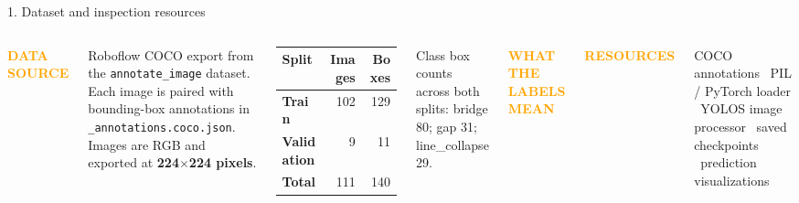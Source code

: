 \documentclass[aspectratio=169,11pt]{beamer}
\newcommand{\tagline}[1]{\textcolor{orange}{\small\bfseries #1}}
\begin{document}
\begin{frame}{1. Dataset and inspection resources}
  \begin{columns}[T]
    \tagline{DATA SOURCE}\par\vspace{0.05cm}
    Roboflow COCO export from the \texttt{annotate\_image} dataset. Each image is paired with bounding-box annotations in \texttt{\_annotations.coco.json}. Images are RGB and exported at \textbf{224$\times$224 pixels}.
    \vspace{0.22cm}
    \begin{tabular}{>{\bfseries}p{2.0cm}r r}
      \toprule
      Split & Images & Boxes\\
      \midrule
      Train & 102 & 129\\
      Validation & 9 & 11\\
      \midrule
      Total & 111 & 140\\
      \bottomrule
    \end{tabular}
    \vspace{0.18cm}

    \scriptsize\textcolor{steel}{Class box counts across both splits: bridge 80; gap 31; line\_collapse 29.}

    \tagline{WHAT THE LABELS MEAN}\par\vspace{0.05cm}
    \vspace{0.18cm}
    \tagline{RESOURCES}\par
    \scriptsize COCO annotations \textbullet\ PIL / PyTorch loader \textbullet\ YOLOS image processor \textbullet\ saved checkpoints \textbullet\ prediction visualizations
  \end{columns}
\end{frame}
\end{document}
